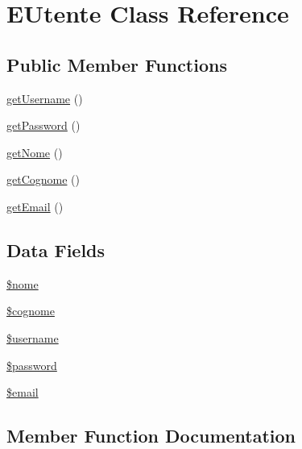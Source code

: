 \hypertarget{class_e_utente}{}\section{E\+Utente Class Reference}
\label{class_e_utente}
\subsection*{Public Member Functions}
\begin{DoxyCompactItemize}
\item 
\mbox{\hyperlink{class_e_utente_a81b37a3c9d639574e394f80c1138c75e}{get\+Username}} ()
\item 
\mbox{\hyperlink{class_e_utente_a04e0957baeb7acde9c0c86556da2d43f}{get\+Password}} ()
\item 
\mbox{\hyperlink{class_e_utente_a67fa74a47af3f2f9eeced7c37c2ef0d3}{get\+Nome}} ()
\item 
\mbox{\hyperlink{class_e_utente_aa114419de31d6dd2151842ea68f84283}{get\+Cognome}} ()
\item 
\mbox{\hyperlink{class_e_utente_a02a01849f28e2535e888ae4ec87b20f2}{get\+Email}} ()
\end{DoxyCompactItemize}
\subsection*{Data Fields}
\begin{DoxyCompactItemize}
\item 
\mbox{\hyperlink{class_e_utente_ac8c9d9dd5d90fa5854f0cb8397084ebd}{\$nome}}
\item 
\mbox{\hyperlink{class_e_utente_a600d90f1a17195713d76b84391b6cd1c}{\$cognome}}
\item 
\mbox{\hyperlink{class_e_utente_a0eb82aa5f81cf845de4b36cd653c42cf}{\$username}}
\item 
\mbox{\hyperlink{class_e_utente_a607686ef9f99ea7c42f4f3dd3dbb2b0d}{\$password}}
\item 
\mbox{\hyperlink{class_e_utente_ad634f418b20382e2802f80532d76d3cd}{\$email}}
\end{DoxyCompactItemize}


\subsection{Member Function Documentation}
\mbox{\label{class_e_utente_aa114419de31d6dd2151842ea68f84283}} 

